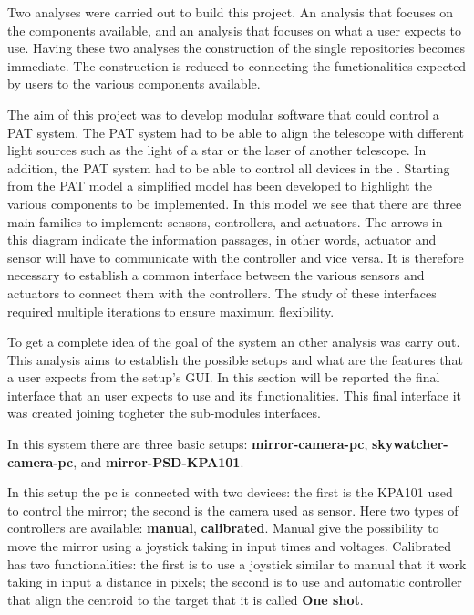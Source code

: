 Two analyses were carried out to build this project. An analysis that focuses on the components available, and an analysis that focuses on what a user expects to use. Having these two analyses the construction of the single repositories becomes immediate. The construction is reduced to connecting the functionalities expected by users to the various components available.

The aim of this project was to develop modular software that could control a PAT system. The PAT system had to be able to align the telescope with different light sources such as the light of a star or the laser of another telescope.
In addition, the PAT system had to be able to control all devices in the .
Starting from the PAT model  a simplified model has been developed  to highlight the various components to be implemented.
In this model we see that there are three main families to implement: sensors, controllers, and actuators. The arrows in this diagram indicate the information passages, in other words, actuator and sensor will have to communicate with the controller and vice versa.
It is therefore necessary to establish a common interface between the various sensors and actuators to connect them with the controllers. The study of these interfaces required multiple iterations to ensure maximum flexibility.

To get a complete idea of the goal of the system an other analysis was carry out. This analysis aims to establish the possible setups and what are the features that a user expects from the setup's GUI.
In this section will be reported the final interface that an user expects to use and its functionalities. This final interface it was created joining togheter the sub-modules interfaces.

In this system there are three basic setups:
\textbf{mirror-camera-pc}, \textbf{skywatcher-camera-pc}, and \textbf{mirror-PSD-KPA101}.

In this setup the pc is connected with two devices: the first is
the KPA101 used to control the mirror; the second is the camera used as
sensor. Here two types of controllers are available: \textbf{manual},
\textbf{calibrated}. Manual give the possibility to move the mirror using a joystick taking
in input times and voltages. Calibrated has two functionalities: the first is to use a joystick
similar to manual that it work taking in input a distance in pixels; the
second is to use and automatic controller that align the centroid to the
target that it is called \textbf{One shot}.


